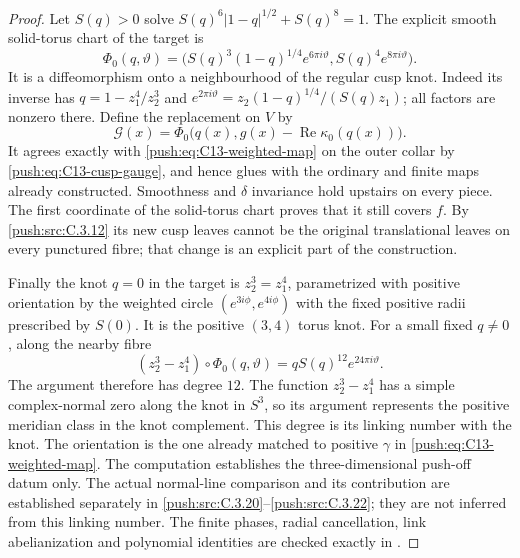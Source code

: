 \begin{proof}
Let $S(q)>0$ solve
$S(q)^6|1-q|^{1/2}+S(q)^8=1$. The explicit smooth solid-torus
chart of the target is
\[
 \Phi_0(q,\vartheta)=
 \bigl(S(q)^3(1-q)^{1/4}e^{6\pi i\vartheta},
                         S(q)^4e^{8\pi i\vartheta}\bigr).
\]
It is a diffeomorphism onto a neighbourhood of the regular
cusp knot. Indeed its inverse has
$q=1-z_1^4/z_2^3$ and
$e^{2\pi i\vartheta}=z_2(1-q)^{1/4}/(S(q)z_1)$;
all factors are nonzero there. Define the replacement on $V$
by
\[
 \mathcal G(x)=
 \Phi_0\bigl(q(x),g(x)-\operatorname{Re}\kappa_0(q(x))\bigr).
\]
It agrees exactly with \eqref{push:eq:C13-weighted-map} on the outer
collar by \eqref{push:eq:C13-cusp-gauge}, and hence glues with the
ordinary and finite maps already constructed. Smoothness and
$\delta$ invariance hold upstairs on every piece. The first
coordinate of the solid-torus chart proves that it still covers
$f$. By \ref{push:src:C.3.12} its new cusp leaves cannot be the original
translational leaves on every punctured fibre; that change is
an explicit part of the construction.

Finally the knot $q=0$ in the target is
$z_2^3=z_1^4$, parametrized with positive orientation by the
weighted circle $(e^{3i\phi},e^{4i\phi})$ with the fixed positive
radii prescribed by $S(0)$. It is the positive $(3,4)$ torus
knot. For a small fixed $q\ne0$, along the nearby fibre
\[
 (z_2^3-z_1^4)\circ\Phi_0(q,\vartheta)
                  =q S(q)^{12}e^{24\pi i\vartheta}.
\]
The argument therefore has degree $12$. The function
$z_2^3-z_1^4$ has a simple complex-normal zero along the
knot in $S^3$, so its argument represents the positive
meridian class in the knot complement. This degree is its
linking number with the knot. The orientation is the one
already matched to positive $\gamma$ in
\eqref{push:eq:C13-weighted-map}. The computation establishes the
three-dimensional push-off datum only. The actual normal-line
comparison and its contribution are established separately in
\ref{push:src:C.3.20}--\ref{push:src:C.3.22}; they are not inferred from this linking number.
The finite phases, radial cancellation, link abelianization and
polynomial identities are checked exactly in
.
\end{proof}
